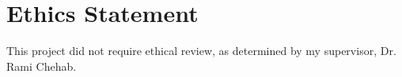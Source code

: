 \documentclass[ oneside,%
                    author={Joshua Felmeden},
                    degree={MEng},
                     title={Sentiment Analysis of Financial Headlines Based on Stock Returns},
                  subtitle={Research}]{dissertation}
\begin{document}





\makedecl





\tableofcontents
\listoffigures
\listoftables




\chapter*{Ethics Statement}

This project did not require ethical review, as determined by my supervisor, Dr. Rami Chehab.



\end{document}
